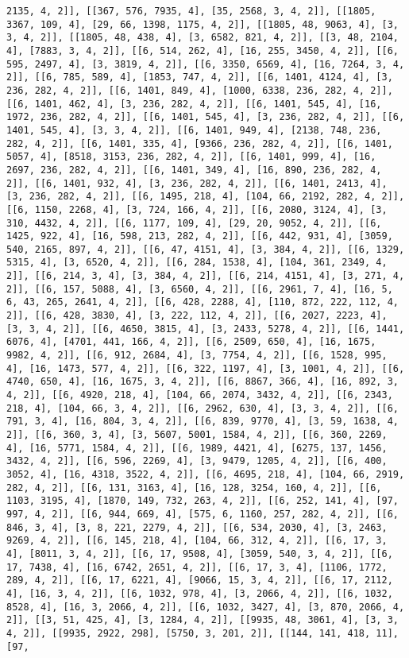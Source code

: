\documentclass[12pt,fleqn]{article}\usepackage{../../common}
\begin{document}
\begin{verbatim}
2135, 4, 2]], [[367, 576, 7935, 4], [35, 2568, 3, 4, 2]], [[1805, 3367, 109, 4], [29, 66, 1398, 1175, 4, 2]], [[1805, 48, 9063, 4], [3, 3, 4, 2]], [[1805, 48, 438, 4], [3, 6582, 821, 4, 2]], [[3, 48, 2104, 4], [7883, 3, 4, 2]], [[6, 514, 262, 4], [16, 255, 3450, 4, 2]], [[6, 595, 2497, 4], [3, 3819, 4, 2]], [[6, 3350, 6569, 4], [16, 7264, 3, 4, 2]], [[6, 785, 589, 4], [1853, 747, 4, 2]], [[6, 1401, 4124, 4], [3, 236, 282, 4, 2]], [[6, 1401, 849, 4], [1000, 6338, 236, 282, 4, 2]], [[6, 1401, 462, 4], [3, 236, 282, 4, 2]], [[6, 1401, 545, 4], [16, 1972, 236, 282, 4, 2]], [[6, 1401, 545, 4], [3, 236, 282, 4, 2]], [[6, 1401, 545, 4], [3, 3, 4, 2]], [[6, 1401, 949, 4], [2138, 748, 236, 282, 4, 2]], [[6, 1401, 335, 4], [9366, 236, 282, 4, 2]], [[6, 1401, 5057, 4], [8518, 3153, 236, 282, 4, 2]], [[6, 1401, 999, 4], [16, 2697, 236, 282, 4, 2]], [[6, 1401, 349, 4], [16, 890, 236, 282, 4, 2]], [[6, 1401, 932, 4], [3, 236, 282, 4, 2]], [[6, 1401, 2413, 4], [3, 236, 282, 4, 2]], [[6, 1495, 218, 4], [104, 66, 2192, 282, 4, 2]], [[6, 1150, 2268, 4], [3, 724, 166, 4, 2]], [[6, 2080, 3124, 4], [3, 310, 4432, 4, 2]], [[6, 1177, 109, 4], [29, 20, 9052, 4, 2]], [[6, 1425, 922, 4], [16, 598, 213, 282, 4, 2]], [[6, 442, 931, 4], [3059, 540, 2165, 897, 4, 2]], [[6, 47, 4151, 4], [3, 384, 4, 2]], [[6, 1329, 5315, 4], [3, 6520, 4, 2]], [[6, 284, 1538, 4], [104, 361, 2349, 4, 2]], [[6, 214, 3, 4], [3, 384, 4, 2]], [[6, 214, 4151, 4], [3, 271, 4, 2]], [[6, 157, 5088, 4], [3, 6560, 4, 2]], [[6, 2961, 7, 4], [16, 5, 6, 43, 265, 2641, 4, 2]], [[6, 428, 2288, 4], [110, 872, 222, 112, 4, 2]], [[6, 428, 3830, 4], [3, 222, 112, 4, 2]], [[6, 2027, 2223, 4], [3, 3, 4, 2]], [[6, 4650, 3815, 4], [3, 2433, 5278, 4, 2]], [[6, 1441, 6076, 4], [4701, 441, 166, 4, 2]], [[6, 2509, 650, 4], [16, 1675, 9982, 4, 2]], [[6, 912, 2684, 4], [3, 7754, 4, 2]], [[6, 1528, 995, 4], [16, 1473, 577, 4, 2]], [[6, 322, 1197, 4], [3, 1001, 4, 2]], [[6, 4740, 650, 4], [16, 1675, 3, 4, 2]], [[6, 8867, 366, 4], [16, 892, 3, 4, 2]], [[6, 4920, 218, 4], [104, 66, 2074, 3432, 4, 2]], [[6, 2343, 218, 4], [104, 66, 3, 4, 2]], [[6, 2962, 630, 4], [3, 3, 4, 2]], [[6, 791, 3, 4], [16, 804, 3, 4, 2]], [[6, 839, 9770, 4], [3, 59, 1638, 4, 2]], [[6, 360, 3, 4], [3, 5607, 5001, 1584, 4, 2]], [[6, 360, 2269, 4], [16, 5771, 1584, 4, 2]], [[6, 1989, 4421, 4], [6275, 137, 1456, 3432, 4, 2]], [[6, 596, 2269, 4], [3, 9479, 1205, 4, 2]], [[6, 400, 3052, 4], [16, 4318, 3522, 4, 2]], [[6, 4695, 218, 4], [104, 66, 2919, 282, 4, 2]], [[6, 131, 3163, 4], [16, 128, 3254, 160, 4, 2]], [[6, 1103, 3195, 4], [1870, 149, 732, 263, 4, 2]], [[6, 252, 141, 4], [97, 997, 4, 2]], [[6, 944, 669, 4], [575, 6, 1160, 257, 282, 4, 2]], [[6, 846, 3, 4], [3, 8, 221, 2279, 4, 2]], [[6, 534, 2030, 4], [3, 2463, 9269, 4, 2]], [[6, 145, 218, 4], [104, 66, 312, 4, 2]], [[6, 17, 3, 4], [8011, 3, 4, 2]], [[6, 17, 9508, 4], [3059, 540, 3, 4, 2]], [[6, 17, 7438, 4], [16, 6742, 2651, 4, 2]], [[6, 17, 3, 4], [1106, 1772, 289, 4, 2]], [[6, 17, 6221, 4], [9066, 15, 3, 4, 2]], [[6, 17, 2112, 4], [16, 3, 4, 2]], [[6, 1032, 978, 4], [3, 2066, 4, 2]], [[6, 1032, 8528, 4], [16, 3, 2066, 4, 2]], [[6, 1032, 3427, 4], [3, 870, 2066, 4, 2]], [[3, 51, 425, 4], [3, 1284, 4, 2]], [[9935, 48, 3061, 4], [3, 3, 4, 2]], [[9935, 2922, 298], [5750, 3, 201, 2]], [[144, 141, 418, 11], [97, 
\end{verbatim}
\end{document}
